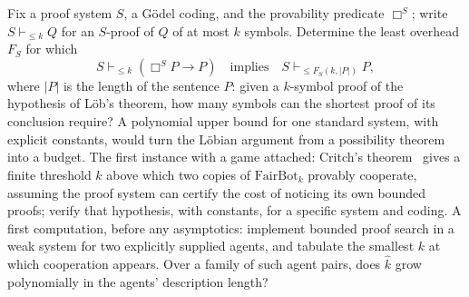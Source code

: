 \begin{openproblem}
Fix a proof system $S$, a G\"odel coding, and the provability predicate $\Box^S$; write $S\vdash_{\le k}Q$ for an $S$-proof of $Q$ of at most $k$ symbols. Determine the least overhead $F_S$ for which
\[
   S\vdash_{\le k}(\Box^S P\to P)
   \quad\text{implies}\quad
   S\vdash_{\le F_S(k,|P|)} P,
\]
where $|P|$ is the length of the sentence $P$: given a $k$-symbol proof of the hypothesis of L\"ob's theorem, how many symbols can the shortest proof of its conclusion require? A polynomial upper bound for one standard system, with explicit constants, would turn the L\"obian argument from a possibility theorem into a budget. The first instance with a game attached: Critch's theorem~\cite{critch2016} gives a finite threshold $\hat k$ above which two copies of $\mathrm{FairBot}_k$ provably cooperate, assuming the proof system can certify the cost of noticing its own bounded proofs; verify that hypothesis, with constants, for a specific system and coding. A first computation, before any asymptotics: implement bounded proof search in a weak system for two explicitly supplied agents, and tabulate the smallest $k$ at which cooperation appears. Over a family of such agent pairs, does $\hat k$ grow polynomially in the agents' description length?
\end{openproblem}


